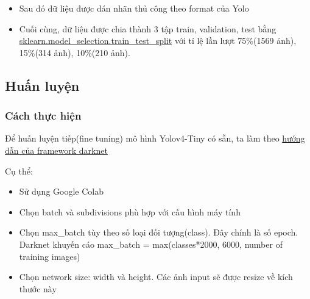 \documentclass[20pt, a4paper]{article}
\begin{document}
\begin{itemize}
\begin{figure}[h!]
\end{figure}

\item
Sau đó dữ liệu được dán nhãn thủ công theo format của Yolo

\item
Cuối cùng, dữ liệu được chia thành 3 tập train, validation, test bằng 
\href{https://scikit-learn.org/stable/modules/generated/sklearn.model\_selection.train\_test_split.html}{sklearn.model\_selection.train\_test\_split} với tỉ lệ lần lượt 75\%(1569 ảnh), 15\%(314 ảnh), 10\%(210 ảnh).
\end{itemize}

\subsection{Huấn luyện}
\subsubsection{Cách thực hiện}
Để huấn luyện tiếp(fine tuning) mô hình Yolov4-Tiny có sẵn, ta làm theo 
\href{https://github.com/AlexeyAB/darknet#how-to-train-tiny-yolo-to-detect-your-custom-objects}{hướng dẫn của framework darknet}

Cụ thể:
\begin{itemize}
	\item Sử dụng Google Colab
	\item Chọn batch và subdivisions phù hợp với cấu hình máy tính
	\item Chọn max\_batch tùy theo số loại đối tượng(class). Đây chính là số epoch. \\
		Darknet khuyến cáo max\_batch = max(classes*2000, 6000, number of training images)
	\item Chọn network size: width và height. Các ảnh input sẽ được resize về kích thước này
\end{itemize}
\end{document}
